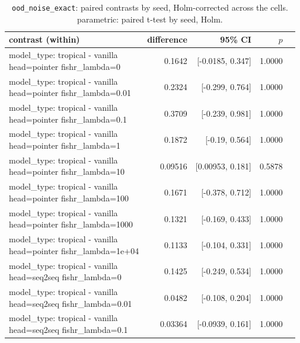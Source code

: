 \documentclass[10pt]{article}
\makeatletter
\newcommand{\stackcell}[1]{\begin{tabular}[t]{@{}l@{}}#1\end{tabular}}
\makeatother
\begin{document}
{\small
\begin{longtable}{lrrrl}
\caption{\texttt{ood\_noise\_exact}: paired contrasts by seed, Holm-corrected across the cells. parametric: paired t-test by seed, Holm.}\label{tab:paired-ood_noise_exact}\\
\toprule
contrast (within) & difference & 95\% CI & $p$ & \\
\midrule
\endhead
\stackcell{model\_type: tropical - vanilla\\\footnotesize head=pointer fishr\_lambda=0 } & 0.1642 & [-0.0185, 0.347] & 1.0000 & \\
\stackcell{model\_type: tropical - vanilla\\\footnotesize head=pointer fishr\_lambda=0.01 } & 0.2324 & [-0.299, 0.764] & 1.0000 & \\
\stackcell{model\_type: tropical - vanilla\\\footnotesize head=pointer fishr\_lambda=0.1 } & 0.3709 & [-0.239, 0.981] & 1.0000 & \\
\stackcell{model\_type: tropical - vanilla\\\footnotesize head=pointer fishr\_lambda=1 } & 0.1872 & [-0.19, 0.564] & 1.0000 & \\
\stackcell{model\_type: tropical - vanilla\\\footnotesize head=pointer fishr\_lambda=10 } & 0.09516 & [0.00953, 0.181] & 0.5878 & \\
\stackcell{model\_type: tropical - vanilla\\\footnotesize head=pointer fishr\_lambda=100 } & 0.1671 & [-0.378, 0.712] & 1.0000 & \\
\stackcell{model\_type: tropical - vanilla\\\footnotesize head=pointer fishr\_lambda=1000 } & 0.1321 & [-0.169, 0.433] & 1.0000 & \\
\stackcell{model\_type: tropical - vanilla\\\footnotesize head=pointer fishr\_lambda=1e+04 } & 0.1133 & [-0.104, 0.331] & 1.0000 & \\
\stackcell{model\_type: tropical - vanilla\\\footnotesize head=seq2seq fishr\_lambda=0 } & 0.1425 & [-0.249, 0.534] & 1.0000 & \\
\stackcell{model\_type: tropical - vanilla\\\footnotesize head=seq2seq fishr\_lambda=0.01 } & 0.0482 & [-0.108, 0.204] & 1.0000 & \\
\stackcell{model\_type: tropical - vanilla\\\footnotesize head=seq2seq fishr\_lambda=0.1 } & 0.03364 & [-0.0939, 0.161] & 1.0000 & \\

\end{longtable}}
\end{document}
